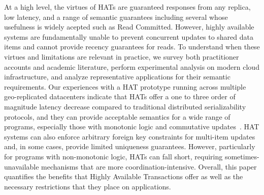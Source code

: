 At a high level, the virtues of HATs are guaranteed responses from any
replica, low latency, and a range of semantic guarantees including
several whose usefulness is widely acepted such as Read
Committed. However, highly available systems are fundamentally unable
to prevent concurrent updates to shared data items and cannot provide
recency guarantees for reads. To understand when these virtues and
limitations are relevant in practice, we survey both practitioner
accounts and academic literature, perform experimental analysis on
modern cloud infrastructure, and analyze representative applications
for their semantic requirements. Our experiences with a HAT prototype
running across multiple geo-replicated datacenters indicate that HATs
offer a one to three order of magnitude latency decrease compared to
traditional distributed serializability protocols, and they can
provide acceptable semantics for a wide range of programs, especially
those with monotonic logic and commutative updates~\cite{calm,
  crdt}. HAT systems can also enforce arbitrary foreign key
constraints for multi-item updates and, in some cases, provide limited
uniqueness guarantees. However, particularly for programs with
non-monotonic logic, HATs can fall short, requiring
sometimes-unavailable mechanisms that are more
coordination-intensive. Overall, this paper quantifies the benefits
that Highly Available Transactions offer as well as the necessary
restrictions that they place on applications.




